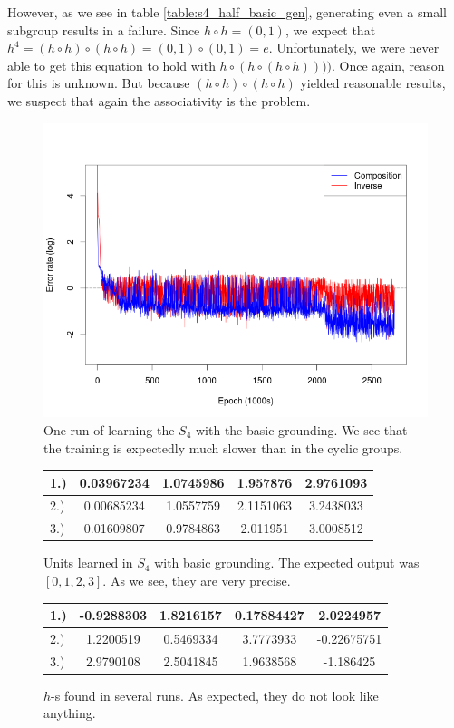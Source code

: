 However, as we see in table \ref{table:s4_half_basic_gen}, generating even a small subgroup results in a failure. Since $h\circ h=(0,1)$, we expect that $h^4=(h\circ h)\circ(h\circ h)=(0,1)\circ(0,1)=e$. Unfortunately, we were never able to get this equation to hold with $h\circ(h\circ(h\circ h))))$. Once again, reason for this is unknown. But because $(h\circ h)\circ (h\circ h)$ yielded reasonable results, we suspect that again the associativity is the problem.

\begin{figure}
\caption{One run of learning the $S_4$ with the basic grounding. We see that the training is expectedly much slower than in the cyclic groups.}
\label{graph:s4_basic}
\includegraphics[width=0.9\linewidth]{../img/s4_comp+inv.png}
\end{figure}

\begin{figure}
\center
\caption{Units learned in $S_4$ with basic grounding. The expected output was $[0,1,2,3]$. As we see, they are very precise.}
\label{table:s4_unit_basic}
\begin{tabular}{l|cccc}
1.) &0.03967234 & 1.0745986 & 1.957876 & 2.9761093\\
\hline
2.) &0.00685234 & 1.0557759 & 2.1151063 & 3.2438033\\
\hline
3.) &0.01609807 & 0.9784863 & 2.011951 & 3.0008512\\
\end{tabular}
\end{figure}

\begin{figure}
\center
\caption{$h$-s found in several runs. As expected, they do not look like anything.}
\label{table:s4_half_basic}
\begin{tabular}{l|cccc}
1.)&-0.9288303 & 1.8216157 & 0.17884427 & 2.0224957\\
\hline
2.)&1.2200519 & 0.5469334 & 3.7773933 & -0.22675751\\
 \hline
3.)&2.9790108 & 2.5041845 & 1.9638568 & -1.186425\\
\end{tabular}
\end{figure}

